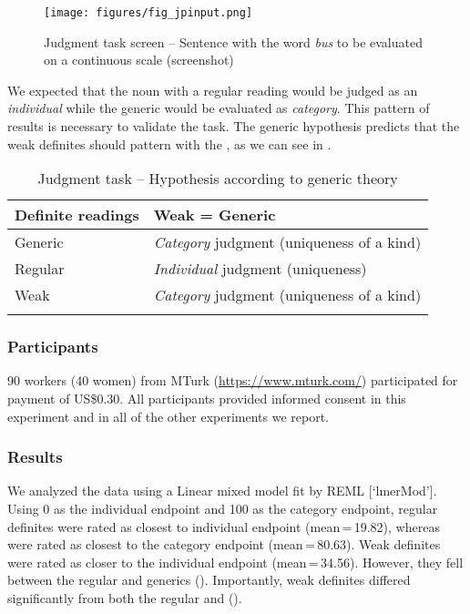 \documentclass[output=paper,
modfonts
]{langscibook}
\begin{document}
\begin{figure}[H]
\centering
\texttt{[image: figures/fig\_jpinput.png]}
\caption{Judgment task screen -- Sentence with the word \textit{bus} to be evaluated on a continuous scale (screenshot)}
\label{fig:desaetal:3}
\end{figure}

We expected that the noun with a regular reading would be judged as an \textit{individual} while the generic would be evaluated as \textit{category}. This pattern of results is necessary to validate the task. The generic hypothesis predicts that the weak definites should pattern with the , as we can see in .

\begin{table}[H]
\centering
\caption{Judgment task -- Hypothesis according to generic theory}
\label{tab:desaetal:2}
\begin{tabular}{ll}
\lsptoprule
{Definite readings} & {Weak = Generic}\\
\midrule
Generic   & \textit{Category} judgment (uniqueness of a kind)\\
Regular   & \textit{Individual} judgment (uniqueness)\\
Weak      & \textit{Category} judgment (uniqueness of a kind)\\ 
\lspbottomrule
\end{tabular}
\end{table}


\subsubsection{Participants}

90 workers (40 women) from MTurk (\url{https://www.mturk.com/}) participated for payment of US\$0.30. All participants provided informed consent in this experiment and in all of the other experiments we report. 

\subsubsection{Results}

We analyzed the data using a Linear mixed model fit by REML [`lmerMod’]. Using 0 as the individual endpoint and 100 as the category endpoint, regular definites were rated as closest to individual endpoint (mean\,=\,19.82), whereas  were rated as closest to the category endpoint (mean\,=\,80.63). Weak definites were rated as closer to the individual endpoint (mean\,=\,34.56). However, they fell between the regular and generics (). Importantly, weak definites differed significantly from both the regular and  ().
\end{document}
